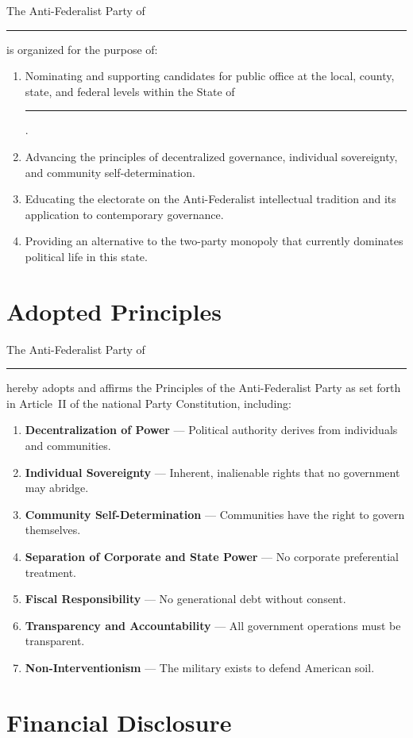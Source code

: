 \documentclass[11pt, letterpaper]{article}
\begin{document}
The Anti-Federalist Party of \rule{4cm}{0.4pt} is organized for the purpose of:

\begin{enumerate}
  \item Nominating and supporting candidates for public office at the local, county, state, and federal levels within the State of \rule{4cm}{0.4pt}.
  \item Advancing the principles of decentralized governance, individual sovereignty, and community self-determination.
  \item Educating the electorate on the Anti-Federalist intellectual tradition and its application to contemporary governance.
  \item Providing an alternative to the two-party monopoly that currently dominates political life in this state.
\end{enumerate}

\section{Adopted Principles}

The Anti-Federalist Party of \rule{4cm}{0.4pt} hereby adopts and affirms the Principles of the Anti-Federalist Party as set forth in Article~II of the national Party Constitution, including:

\begin{enumerate}
  \item \textbf{Decentralization of Power} --- Political authority derives from individuals and communities.
  \item \textbf{Individual Sovereignty} --- Inherent, inalienable rights that no government may abridge.
  \item \textbf{Community Self-Determination} --- Communities have the right to govern themselves.
  \item \textbf{Separation of Corporate and State Power} --- No corporate preferential treatment.
  \item \textbf{Fiscal Responsibility} --- No generational debt without consent.
  \item \textbf{Transparency and Accountability} --- All government operations must be transparent.
  \item \textbf{Non-Interventionism} --- The military exists to defend American soil.
\end{enumerate}

\section{Financial Disclosure}
\end{document}
